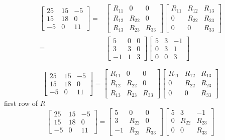 \begin{example}
    $$ \begin{aligned}\left[\begin{array}{rrr}25 & 15 & -5 \\ 15 & 18 & 0 \\ -5 & 0 & 11\end{array}\right]=&\left[\begin{array}{ccc}R_{11} & 0 & 0 \\ R_{12} & R_{22} & 0 \\ R_{13} & R_{23} & R_{33}\end{array}\right]\left[\begin{array}{ccc}R_{11} & R_{12} & R_{13} \\ 0 & R_{22} & R_{23} \\ 0 & 0 & R_{33}\end{array}\right] \\=&\left[\begin{array}{rrr}5 & 0 & 0 \\ 3 & 3 & 0 \\ -1 & 1 & 3\end{array}\right]\left[\begin{array}{rrr}5 & 3 & -1 \\ 0 & 3 & 1 \\ 0 & 0 & 3\end{array}\right] \end{aligned} $$

    $$
\left[\begin{array}{rrr}
25 & 15 & -5 \\
15 & 18 & 0 \\
-5 & 0 & 11
\end{array}\right]=\left[\begin{array}{ccc}
R_{11} & 0 & 0 \\
R_{12} & R_{22} & 0 \\
R_{13} & R_{23} & R_{33}
\end{array}\right]\left[\begin{array}{ccc}
R_{11} & R_{12} & R_{13} \\
0 & R_{22} & R_{23} \\
0 & 0 & R_{33}
\end{array}\right]
$$
first row of $ R $
$$
\left[\begin{array}{rrr}
25 & 15 & -5 \\
15 & 18 & 0 \\
-5 & 0 & 11
\end{array}\right]=\left[\begin{array}{rcc}
5 & 0 & 0 \\
3 & R_{22} & 0 \\
-1 & R_{23} & R_{33}
\end{array}\right]\left[\begin{array}{ccc}
5 & 3 & -1 \\
0 & R_{22} & R_{23} \\
0 & 0 & R_{33}
\end{array}\right]
$$


\end{example}
